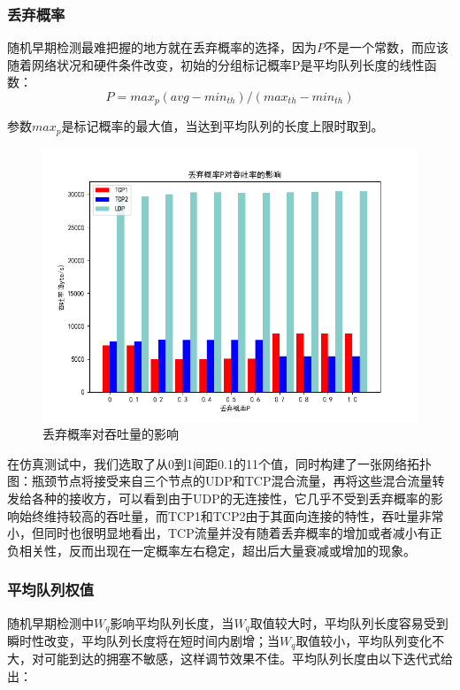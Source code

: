 \documentclass{article}
\begin{document}
\subsubsection{丢弃概率}
随机早期检测最难把握的地方就在丢弃概率的选择，因为$P$不是一个常数，而应该随着网络状况和硬件条件改变，初始的分组标记概率P是平均队列长度的线性函数：
\begin{equation*}
	P=max_p(avg-min_{th})/(max_{th}-min_{th})
\end{equation*}

参数$max_p$是标记概率的最大值，当达到平均队列的长度上限时取到。

\begin{figure}[H]
	\centering
	\includegraphics[scale=0.6]{picture/p.png}
	\caption{丢弃概率对吞吐量的影响}
	\label{fig:p}
\end{figure}

在仿真测试中，我们选取了从0到1间距0.1的11个值，同时构建了一张网络拓扑图：瓶颈节点将接受来自三个节点的UDP和TCP混合流量，再将这些混合流量转发给各种的接收方，可以看到由于UDP的无连接性，它几乎不受到丢弃概率的影响始终维持较高的吞吐量，而TCP1和TCP2由于其面向连接的特性，吞吐量非常小，但同时也很明显地看出，TCP流量并没有随着丢弃概率的增加或者减小有正负相关性，反而出现在一定概率左右稳定，超出后大量衰减或增加的现象。

\subsubsection{平均队列权值}

随机早期检测中$W_q$影响平均队列长度，当$W_q$取值较大时，平均队列长度容易受到瞬时性改变，平均队列长度将在短时间内剧增；当$W_q$取值较小，平均队列变化不大，对可能到达的拥塞不敏感，这样调节效果不佳。平均队列长度由以下迭代式给出：
\end{document}
